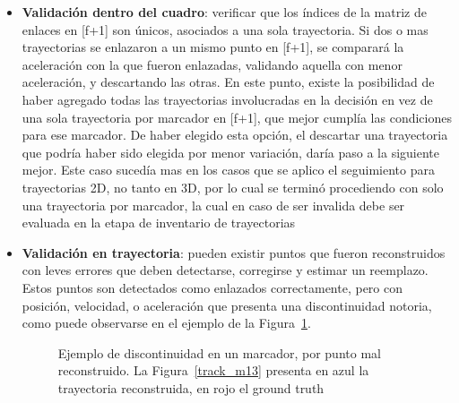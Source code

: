 \begin{itemize}
\item \textbf{Validación dentro del cuadro}: verificar que los índices de la matriz de enlaces en [f+1] son únicos, asociados a una sola trayectoria. Si dos o mas trayectorias se enlazaron a un mismo punto en [f+1], se comparará la aceleración con la que fueron enlazadas, validando aquella con menor aceleración, y descartando las otras. En este punto, existe la posibilidad de haber agregado todas las trayectorias involucradas en la decisión en vez de una sola trayectoria por marcador en [f+1], que mejor cumplía las condiciones para ese marcador. De haber elegido esta opción, el descartar una trayectoria que podría haber sido elegida por menor variación, daría paso a la siguiente mejor. Este caso sucedía mas en los casos que se aplico el seguimiento para trayectorias 2D, no tanto en 3D, por lo cual se terminó procediendo con solo una trayectoria por marcador, la cual en caso de ser invalida debe ser evaluada en la etapa de inventario de trayectorias  
\item \textbf{Validación en trayectoria}: pueden existir puntos que fueron reconstruidos con leves errores que deben detectarse, corregirse y estimar un reemplazo. Estos puntos son detectados como enlazados correctamente, pero con posición, velocidad, o aceleración que presenta una discontinuidad notoria, como puede observarse en el ejemplo de la Figura~\ref{discontinuidad_tracking}.

\begin{figure}[ht!]
 \centering
 \caption{Ejemplo de discontinuidad en un marcador, por punto mal reconstruido. La Figura~\ref{track_m13} presenta en azul la trayectoria reconstruida, en rojo el ground truth}
 \label{discontinuidad_tracking}
\end{figure}


\end{itemize}
